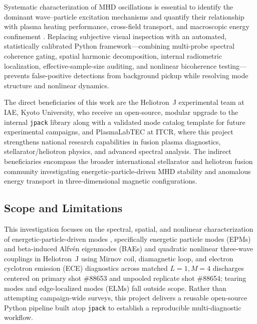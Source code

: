 Systematic characterization of MHD oscillations is essential to identify the dominant wave--particle excitation mechanisms and quantify their relationship with plasma heating performance, cross-field transport, and macroscopic energy confinement \cite{Zhong2024, Kin2025, Miyashita2025}. Replacing subjective visual inspection with an automated, statistically calibrated Python framework---combining multi-probe spectral coherence gating, spatial harmonic decomposition, internal radiometric localization, effective-sample-size auditing, and nonlinear bicoherence testing---prevents false-positive detections from background pickup while resolving mode structure and nonlinear dynamics.

The direct beneficiaries of this work are the Heliotron~J experimental team at IAE, Kyoto University, who receive an open-source, modular upgrade to the internal \texttt{jpack} library along with a validated mode catalog template for future experimental campaigns, and PlasmaLabTEC at ITCR, where this project strengthens national research capabilities in fusion plasma diagnostics, stellarator/heliotron physics, and advanced spectral analysis. The indirect beneficiaries encompass the broader international stellarator and heliotron fusion community investigating energetic-particle-driven MHD stability and anomalous energy transport in three-dimensional magnetic configurations.

\subsection{Scope and Limitations}

This investigation focuses on the spectral, spatial, and nonlinear characterization of energetic-particle-driven modes \cite{Zhong2024}, specifically energetic particle modes (EPMs) and beta-induced Alfv\'en eigenmodes (BAEs) and quadratic nonlinear three-wave couplings \cite{Kin2025} in Heliotron~J using Mirnov coil, diamagnetic loop, and electron cyclotron emission (ECE) diagnostics across matched $L=1, M=4$ discharges centered on primary shot \#88653 and unpooled replicate shot \#88654; tearing modes and edge-localized modes (ELMs) fall outside scope. Rather than attempting campaign-wide surveys, this project delivers a reusable open-source Python pipeline built atop \texttt{jpack} to establish a reproducible multi-diagnostic workflow.

